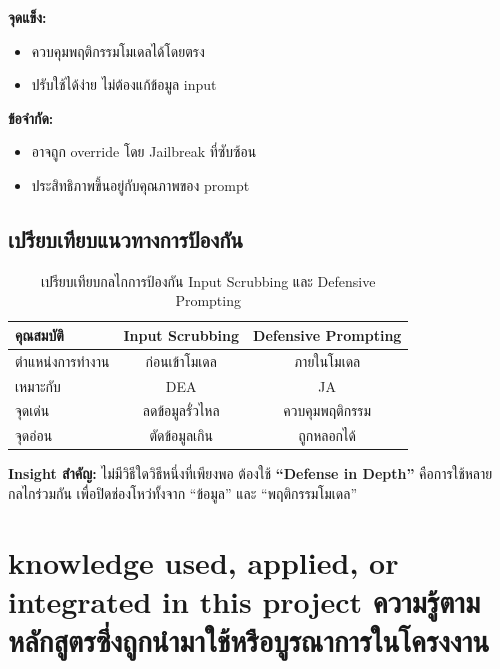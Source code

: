 \textbf{จุดแข็ง:}
\begin{itemize}
  \item ควบคุมพฤติกรรมโมเดลได้โดยตรง
  \item ปรับใช้ได้ง่าย ไม่ต้องแก้ข้อมูล input
\end{itemize}

\textbf{ข้อจำกัด:}
\begin{itemize}
  \item อาจถูก override โดย Jailbreak ที่ซับซ้อน
  \item ประสิทธิภาพขึ้นอยู่กับคุณภาพของ prompt
\end{itemize}

\subsection{เปรียบเทียบแนวทางการป้องกัน}

\begin{table}[ht]
\centering
\begin{tabular}{|l|c|c|}
\hline
\textbf{คุณสมบัติ} & \textbf{Input Scrubbing} & \textbf{Defensive Prompting} \\
\hline
ตำแหน่งการทำงาน   & ก่อนเข้าโมเดล            & ภายในโมเดล                   \\
\hline
เหมาะกับ           & DEA                      & JA                           \\
\hline
จุดเด่น            & ลดข้อมูลรั่วไหล          & ควบคุมพฤติกรรม               \\
\hline
จุดอ่อน            & ตัดข้อมูลเกิน            & ถูกหลอกได้                   \\
\hline
\end{tabular}
\caption{เปรียบเทียบกลไกการป้องกัน Input Scrubbing และ Defensive Prompting}
\end{table}

\textbf{Insight สำคัญ:}
ไม่มีวิธีใดวิธีหนึ่งที่เพียงพอ ต้องใช้ \textbf{``Defense in Depth''}
คือการใช้หลายกลไกร่วมกัน เพื่อปิดช่องโหว่ทั้งจาก ``ข้อมูล'' และ ``พฤติกรรมโมเดล''

\section{\ifenglish%
  \fi knowledge used, applied, or integrated in this project
\else%
  ความรู้ตามหลักสูตรซึ่งถูกนำมาใช้หรือบูรณาการในโครงงาน
\fi}

